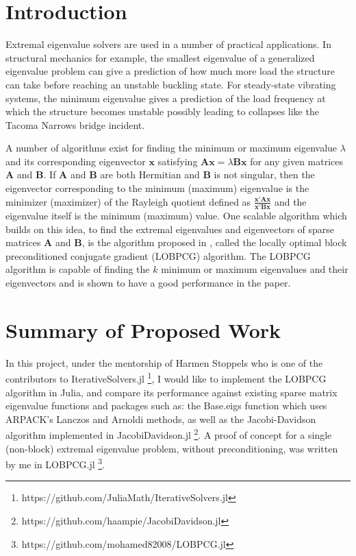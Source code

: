 \documentclass[12pt]{article}
\begin{document}
\section{Introduction}

Extremal eigenvalue solvers are used in a number of practical applications. In structural mechanics for example, the smallest eigenvalue of a generalized eigenvalue problem can give a prediction of how much more load the structure can take before reaching an unstable buckling state. For steady-state vibrating systems, the minimum eigenvalue gives a prediction of the load frequency at which the structure becomes unstable possibly leading to collapses like the Tacoma Narrows bridge incident. 

A number of algorithms exist for finding the minimum or maximum eigenvalue $\lambda$ and its corresponding eigenvector $\bm{x}$ satisfying $\bm{A}\bm{x} = \lambda \bm{B}\bm{x}$ for any given matrices $\bm{A}$ and $\bm{B}$. If $\bm{A}$ and $\bm{B}$ are both Hermitian and $\bm{B}$ is not singular, then the eigenvector corresponding to the minimum (maximum) eigenvalue is the minimizer (maximizer) of the Rayleigh quotient defined as $\frac{\bm{x}'\bm{A}\bm{x}}{\bm{x}'\bm{B}\bm{x}}$ and the eigenvalue itself is the minimum (maximum) value. One scalable algorithm which builds on this idea, to find the extremal eigenvalues and eigenvectors of sparse matrices $\bm{A}$ and $\bm{B}$, is the algorithm proposed in \cite{Knyazev2001}, called the locally optimal block preconditioned conjugate gradient (LOBPCG) algorithm. The LOBPCG algorithm is capable of finding the $k$ minimum or maximum eigenvalues and their eigenvectors and is shown to have a good performance in the paper.

\section{Summary of Proposed Work}

In this project, under the mentorship of Harmen Stoppels who is one of the contributors to IterativeSolvers.jl \footnote{https://github.com/JuliaMath/IterativeSolvers.jl}, I would like to implement the LOBPCG algorithm in Julia, and compare its performance against existing sparse matrix eigenvalue functions and packages such as: the Base.eigs function which uses ARPACK's Lanczos and Arnoldi methods, as well as the Jacobi-Davidson algorithm implemented in JacobiDavidson.jl \footnote{https://github.com/haampie/JacobiDavidson.jl}. A proof of concept for a single (non-block) extremal eigenvalue problem, without preconditioning, was written by me in LOBPCG.jl \footnote{https://github.com/mohamed82008/LOBPCG.jl}.
\end{document}
